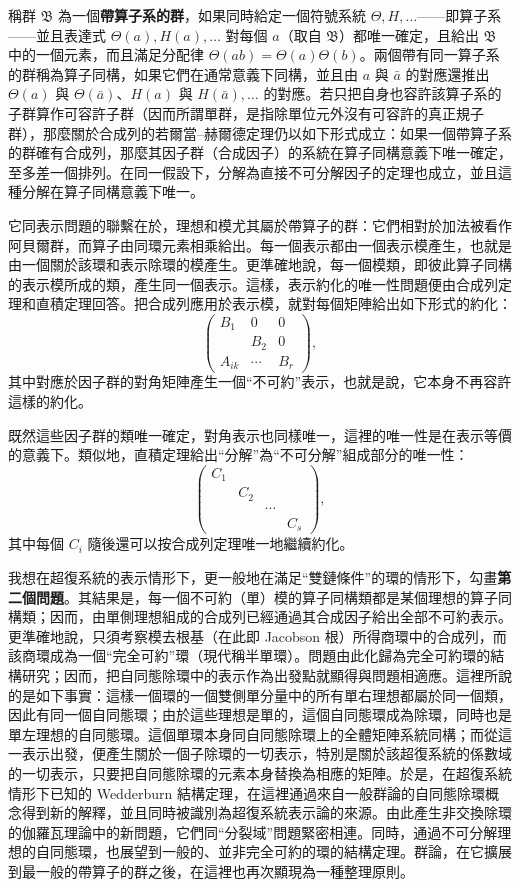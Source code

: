 \documentclass[11pt]{article}
\newcommand{\srcemph}[1]{\textbf{#1}}
\begin{document}
稱群 $\mathfrak{B}$ 為一個\srcemph{帶算子系的群}，如果同時給定一個符號系統 $\Theta,H,\ldots$——即算子系——並且表達式 $\Theta(a),H(a),\ldots$ 對每個 $a$（取自 $\mathfrak{B}$）都唯一確定，且給出 $\mathfrak{B}$ 中的一個元素，而且滿足分配律 $\Theta(ab)=\Theta(a)\Theta(b)$。兩個帶有同一算子系的群稱為算子同構，如果它們在通常意義下同構，並且由 $a$ 與 $\bar a$ 的對應還推出 $\Theta(a)$ 與 $\Theta(\bar a)$、$H(a)$ 與 $H(\bar a),\ldots$ 的對應。若只把自身也容許該算子系的子群算作可容許子群（因而所謂單群，是指除單位元外沒有可容許的真正規子群），那麼關於合成列的若爾當--赫爾德定理仍以如下形式成立：如果一個帶算子系的群確有合成列，那麼其因子群（合成因子）的系統在算子同構意義下唯一確定，至多差一個排列。在同一假設下，分解為直接不可分解因子的定理也成立，並且這種分解在算子同構意義下唯一。

它同表示問題的聯繫在於，理想和模尤其屬於帶算子的群：它們相對於加法被看作阿貝爾群，而算子由同環元素相乘給出。每一個表示都由一個表示模產生，也就是由一個關於該環和表示除環的模產生。更準確地說，每一個模類，即彼此算子同構的表示模所成的類，產生同一個表示。這樣，表示約化的唯一性問題便由合成列定理和直積定理回答。把合成列應用於表示模，就對每個矩陣給出如下形式的約化：
\[
\begin{pmatrix}
B_1&0&0\\
&B_2&0\\
A_{ik}&\cdots&B_r
\end{pmatrix},
\]
其中對應於因子群的對角矩陣產生一個“不可約”表示，也就是說，它本身不再容許這樣的約化。

\pagebreak[4]
既然這些因子群的類唯一確定，對角表示也同樣唯一，這裡的唯一性是在表示等價的\mbox{意義下。}類似地，直積定理給出“分解”為“不可分解”組成部分的唯一性：
\[
\begin{pmatrix}
C_1&&&\\
&C_2&&\\
&&\cdots&\\
&&&C_s
\end{pmatrix},
\]
其中每個 $C_i$ 隨後還可以按合成列定理唯一地繼續約化。

我想在超復系統的表示情形下，更一般地在滿足“雙鏈條件”的環的情形下，勾畫\srcemph{第二個問題}。其結果是，每一個不可約（單）模的算子同構類都是某個理想的算子同構類；因而，由單側理想組成的合成列已經通過其合成因子給出全部不可約表示。更準確地說，只須考察模去根基（在此即 Jacobson 根）所得商環中的合成列，而該商環成為一個“完全可約”環（現代稱半單環）。問題由此化歸為完全可約環的結構研究；因而，把自同態除環中的表示作為出發點就顯得與問題相適應。這裡所說的是如下事實：這樣一個環的一個雙側單分量中的所有單右理想都屬於同一個類，因此有同一個自同態環；由於這些理想是單的，這個自同態環成為除環，同時也是單左理想的自同態環。這個單環本身同自同態除環上的全體矩陣系統同構；而從這一表示出發，便產生關於一個子除環的一切表示，特別是關於該超復系統的係數域的一切表示，只要把自同態除環的元素本身替換為相應的矩陣。於是，在超復系統情形下已知的 Wedderburn 結構定理，在這裡通過來自一般群論的自同態除環概念得到新的解釋，並且同時被識別為超復系統表示論的來源。由此產生非交換除環的伽羅瓦理論中的新問題，它們同“分裂域”問題緊密相連。同時，通過不可分解理想的自同態環，也展望到一般的、並非完全可約的環的結構定理。群論，在它擴展到最一般的帶算子的群之後，在這裡也再次顯現為一種整理原則。

\endgroup
\end{document}
